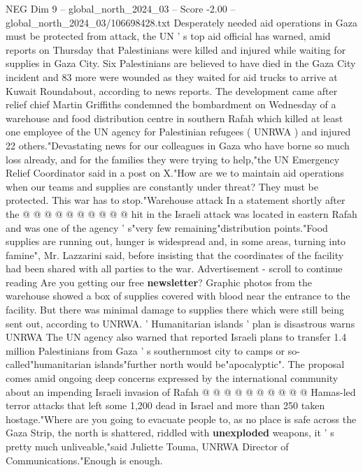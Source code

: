 \begin{textsample}{NEG Dim 9 – global\_north\_2024\_03 – Score -2.00 – global\_north\_2024\_03/106698428.txt}  \label{ex:f9_neg_177}
Desperately needed aid operations in Gaza must be protected from attack, the UN ' s top aid official has warned, amid reports on Thursday that Palestinians were killed and injured while waiting for supplies in Gaza City.
Six Palestinians are believed to have died in the Gaza City incident and 83 more were wounded as they waited for aid trucks to arrive at Kuwait Roundabout, according to news reports.
The development came after relief chief Martin Griffiths condemned the bombardment on Wednesday of a warehouse and food distribution centre in southern Rafah which killed at least one employee of the UN agency for Palestinian refugees ( UNRWA ) and injured 22 others."Devastating news for our colleagues in Gaza who have borne so much loss already, and for the families they were trying to help,"the UN Emergency Relief Coordinator said in a post on X."How are we to maintain aid operations when our teams and supplies are constantly under threat?
They must be protected.
This war has to stop."Warehouse attack In a statement shortly after the @ @ @ @ @ @ @ @ @ @ hit in the Israeli attack was located in eastern Rafah and was one of the agency ' s"very few remaining"distribution points."Food supplies are running out, hunger is widespread and, in some areas, turning into famine", Mr.
Lazzarini said, before insisting that the coordinates of the facility had been shared with all parties to the war.
Advertisement - scroll to continue reading Are you getting our free \textbf{newsletter}?
Graphic photos from the warehouse showed a box of supplies covered with blood near the entrance to the facility.
But there was minimal damage to supplies there which were still being sent out, according to UNRWA. ' Humanitarian islands ' plan is disastrous warns UNRWA The UN agency also warned that reported Israeli plans to transfer 1.4 million Palestinians from Gaza ' s southernmost city to camps or so-called"humanitarian islands"further north would be"apocalyptic".
The proposal comes amid ongoing deep concerns expressed by the international community about an impending Israeli invasion of Rafah @ @ @ @ @ @ @ @ @ @ Hamas-led terror attacks that left some 1,200 dead in Israel and more than 250 taken hostage."Where are you going to evacuate people to, as no place is safe across the Gaza Strip, the north is shattered, riddled with \textbf{unexploded} weapons, it ' s pretty much unliveable,"said Juliette Touma, UNRWA Director of Communications."Enough is enough.

\end{textsample}
